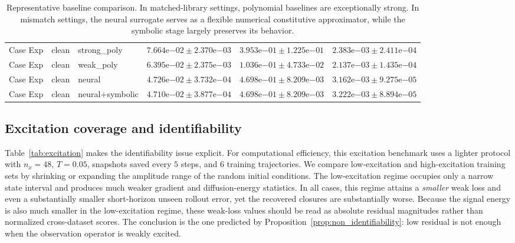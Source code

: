 \begin{table}[t]
{\begin{tabular}{lllccc}
\midrule
Case Exp & clean & strong\_poly & $7.664\mathrm{e}{-02} \pm 2.370\mathrm{e}{-03}$ & $3.953\mathrm{e}{-01} \pm 1.225\mathrm{e}{-01}$ & $2.383\mathrm{e}{-03} \pm 2.411\mathrm{e}{-04}$ \\
Case Exp & clean & weak\_poly & $6.395\mathrm{e}{-02} \pm 2.375\mathrm{e}{-03}$ & $1.036\mathrm{e}{-01} \pm 4.733\mathrm{e}{-02}$ & $2.137\mathrm{e}{-03} \pm 1.435\mathrm{e}{-04}$ \\
Case Exp & clean & neural & $4.726\mathrm{e}{-02} \pm 3.732\mathrm{e}{-04}$ & $4.698\mathrm{e}{-01} \pm 8.209\mathrm{e}{-03}$ & $3.162\mathrm{e}{-03} \pm 9.275\mathrm{e}{-05}$ \\
Case Exp & clean & neural+symbolic & $4.710\mathrm{e}{-02} \pm 3.877\mathrm{e}{-04}$ & $4.698\mathrm{e}{-01} \pm 8.209\mathrm{e}{-03}$ & $3.222\mathrm{e}{-03} \pm 8.894\mathrm{e}{-05}$ \\
\bottomrule
\end{tabular}
}
\caption{Representative baseline comparison. In matched-library settings, polynomial baselines are exceptionally strong. In mismatch settings, the neural surrogate serves as a flexible numerical constitutive approximator, while the symbolic stage largely preserves its behavior.}
\label{tab:baseline_map}
\end{table}

\subsection{Excitation coverage and identifiability}

Table~\ref{tab:excitation} makes the identifiability issue explicit. For computational efficiency, this excitation benchmark uses a lighter protocol with $n_x=48$, $T=0.05$, snapshots saved every $5$ steps, and $6$ training trajectories. We compare low-excitation and high-excitation training sets by shrinking or expanding the amplitude range of the random initial conditions. The low-excitation regime occupies only a narrow state interval and produces much weaker gradient and diffusion-energy statistics. In all cases, this regime attains a \emph{smaller} weak loss and even a substantially smaller short-horizon unseen rollout error, yet the recovered closures are substantially worse. Because the signal energy is also much smaller in the low-excitation regime, these weak-loss values should be read as absolute residual magnitudes rather than normalized cross-dataset scores. The conclusion is the one predicted by Proposition~\ref{prop:non_identifiability}: low residual is not enough when the observation operator is weakly excited.

